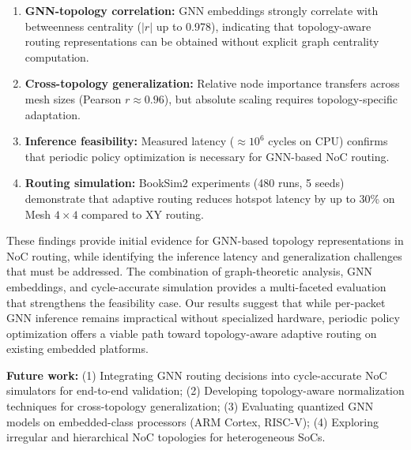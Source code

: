 \documentclass[conference]{IEEEtran}
\begin{document}
\begin{enumerate}
    \item \textbf{GNN-topology correlation:} GNN embeddings strongly correlate with betweenness centrality ($|r|$ up to 0.978), indicating that topology-aware routing representations can be obtained without explicit graph centrality computation.
    \item \textbf{Cross-topology generalization:} Relative node importance transfers across mesh sizes (Pearson $r \approx 0.96$), but absolute scaling requires topology-specific adaptation.
    \item \textbf{Inference feasibility:} Measured latency ($\approx 10^6$ cycles on CPU) confirms that periodic policy optimization is necessary for GNN-based NoC routing.
    \item \textbf{Routing simulation:} BookSim2 experiments (480 runs, 5 seeds) demonstrate that adaptive routing reduces hotspot latency by up to 30\% on Mesh $4\times4$ compared to XY routing.
\end{enumerate}

These findings provide initial evidence for GNN-based topology representations in NoC routing, while identifying the inference latency and generalization challenges that must be addressed. The combination of graph-theoretic analysis, GNN embeddings, and cycle-accurate simulation provides a multi-faceted evaluation that strengthens the feasibility case. Our results suggest that while per-packet GNN inference remains impractical without specialized hardware, periodic policy optimization offers a viable path toward topology-aware adaptive routing on existing embedded platforms.

\textbf{Future work:} (1) Integrating GNN routing decisions into cycle-accurate NoC simulators for end-to-end validation; (2) Developing topology-aware normalization techniques for cross-topology generalization; (3) Evaluating quantized GNN models on embedded-class processors (ARM Cortex, RISC-V); (4) Exploring irregular and hierarchical NoC topologies for heterogeneous SoCs.
\end{document}
